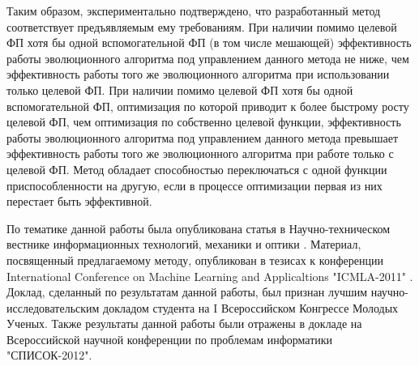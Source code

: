 Таким образом, экспериментально подтверждено, что разработанный метод соответствует предъявляемым ему требованиям. При наличии помимо целевой ФП хотя бы одной вспомогательной ФП (в том числе мешающей) эффективность работы эволюционного алгоритма под управлением данного метода не ниже, чем эффективность работы того же эволюционного алгоритма при использовании только целевой ФП. При наличии помимо целевой ФП хотя бы одной вспомогательной ФП, оптимизация по которой приводит к более быстрому росту целевой ФП, чем оптимизация по собственно целевой функции, эффективность работы эволюционного алгоритма под управлением данного метода превышает эффективность работы того же эволюционного алгоритма при работе только с целевой ФП. Метод обладает способностью переключаться с одной функции приспособленности на другую, если в процессе оптимизации первая из них перестает быть эффективной.

По тематике данной работы была опубликована статья в Научно-техническом вестнике информационных технологий, механики и оптики \cite{vestnik}. Материал, посвященный предлагаемому методу, опубликован в тезисах к конференции International Conference on Machine Learning and Applicaltions "ICMLA-2011" \cite{strings}. Доклад, сделанный по результатам данной работы, был признан лучшим научно-исследовательским докладом студента на I Всероссийском Конгрессе Молодых Ученых. Также результаты данной работы были отражены в докладе на Всероссийской научной конференции по проблемам информатики "СПИСОК-2012".
